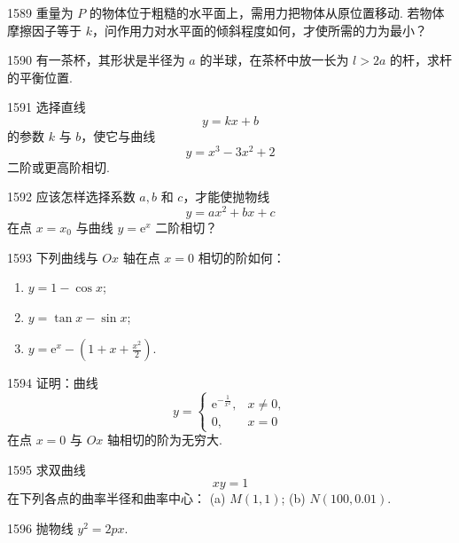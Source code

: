 \begin{prob}[M]{1589}
重量为 $P$ 的物体位于粗糙的水平面上，需用力把物体从原位置移动. 若物体摩擦因子等于 $k$，问作用力对水平面的倾斜程度如何，才使所需的力为最小？
\end{prob}

\begin{prob}[M]{1590}
有一茶杯，其形状是半径为 $a$ 的半球，在茶杯中放一长为 $l > 2a$ 的杆，求杆的平衡位置.
\end{prob}


\begin{prob}[M]{1591}
选择直线
\[
y = kx + b
\]
的参数 $k$ 与 $b$，使它与曲线
\[
y = x^3 - 3x^2 + 2
\]
二阶或更高阶相切.
\end{prob}

\begin{prob}[M]{1592}
应该怎样选择系数 $a, b$ 和 $c$，才能使抛物线
\[
y = ax^2 + bx + c
\]
在点 $x = x_0$ 与曲线 $y = \mathrm{e}^x$ 二阶相切？
\end{prob}

\begin{prob}[L]{1593}
下列曲线与 $Ox$ 轴在点 $x = 0$ 相切的阶如何：
\begin{enumerate}[label=(\alph*), itemsep=2pt, topsep=3pt]
\item $y = 1 - \cos x$;
\item $y = \tan x - \sin x$;
\item $y = \mathrm{e}^x - \left(1 + x + \frac{x^2}{2}\right)$.
\end{enumerate}
\end{prob}

\begin{prob}[M]{1594}
证明：曲线
\[
y = \begin{cases} \mathrm{e}^{-\frac{1}{x^2}}, & x \neq 0, \\ 0, & x = 0 \end{cases}
\]
在点 $x = 0$ 与 $Ox$ 轴相切的阶为无穷大.
\end{prob}

\begin{prob}[M]{1595}
求双曲线
\[
xy = 1
\]
在下列各点的曲率半径和曲率中心：
(a) $M(1, 1)$; \qquad (b) $N(100, 0.01)$.
\end{prob}


\begin{prob}[S]{1596}
抛物线 $y^2 = 2px$.
\end{prob}

